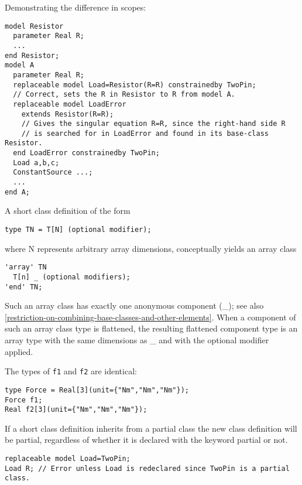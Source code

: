 \begin{example}
Demonstrating the difference in scopes:
\begin{lstlisting}[language=modelica]
model Resistor
  parameter Real R;
  ...
end Resistor;
model A
  parameter Real R;
  replaceable model Load=Resistor(R=R) constrainedby TwoPin;
  // Correct, sets the R in Resistor to R from model A.
  replaceable model LoadError
    extends Resistor(R=R);
    // Gives the singular equation R=R, since the right-hand side R
    // is searched for in LoadError and found in its base-class Resistor.
  end LoadError constrainedby TwoPin;
  Load a,b,c;
  ConstantSource ...;
  ...
end A;
\end{lstlisting}
\end{example}

A short class definition of the form
\begin{lstlisting}[language=modelica]
type TN = T[N] (optional modifier);
\end{lstlisting}

where N represents arbitrary array dimensions, conceptually yields an
array class

\begin{lstlisting}[language=modelica]
'array' TN
  T[n] _ (optional modifiers);
'end' TN;
\end{lstlisting}

Such an array class has exactly one anonymous component (\_); see also
\cref{restriction-on-combining-base-classes-and-other-elements}.
When a component of such an array class type is
flattened, the resulting flattened component type is an array type with
the same dimensions as \_ and with the optional modifier applied.

\begin{example}
The types of \lstinline!f1! and \lstinline!f2! are identical:
\begin{lstlisting}[language=modelica]
type Force = Real[3](unit={"Nm","Nm","Nm"});
Force f1;
Real f2[3](unit={"Nm","Nm","Nm"});
\end{lstlisting}
\end{example}

If a short class definition inherits from a partial class the new class
definition will be partial, regardless of whether it is declared with
the keyword partial or not.

\begin{example}
\begin{lstlisting}[language=modelica]
replaceable model Load=TwoPin;
Load R; // Error unless Load is redeclared since TwoPin is a partial class.
\end{lstlisting}
\end{example}

